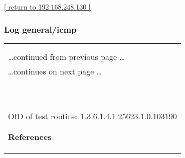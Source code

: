 \documentclass{article}
\begin{document}
\begin{footnotesize}\hyperref[host:192.168.248.130]{[ return to 192.168.248.130 ]}\end{footnotesize}
\subsubsection{Log general/icmp}
\label{port:192.168.248.130 general/icmp Log}

\begin{longtable}{|p{}|}
\hline
\rowcolor{openvas_log}{\color{white}{Log (CVSS: 0.0) }}\\
\rowcolor{openvas_log}{\color{white}{NVT: ICMP Timestamp Detection}}\\
\hline
\endfirsthead
\hfill\ldots continued from previous page \ldots \\
\hline
\endhead
\hline
\ldots continues on next page \ldots \\
\endfoot
\hline
\endlastfoot
\\
\rowcolor{white}{\verb= Summary:=}\\
\rowcolor{white}{\verb= The remote host responded to an ICMP timestamp request. The Timestamp Reply is=}\\
\rowcolor{white}{\verb=an ICMP message which replies to a Timestamp message. It consists of the=}\\
\rowcolor{white}{\verb=originating timestamp sent by the sender of the Timestamp as well as a receive=}\\
\rowcolor{white}{\verb=timestamp and a transmit timestamp. This information could theoretically be used=}\\
\rowcolor{white}{\verb=to exploit weak time-based random number generators in other services.=}\\
\rowcolor{white}{\verb==}\\
\rowcolor{white}{\verb==}\\
\\
OID of test routine: 1.3.6.1.4.1.25623.1.0.103190\\
\\

      \hline
      \\
\textbf{References}\\
\rowcolor{white}{\verb=CVE: CVE-1999-0524=}\\
\rowcolor{white}{\verb=Other:=}\\
\rowcolor{white}{\verb=  URL:http://www.ietf.org/rfc/rfc0792.txt=}\\
\end{longtable}
\end{document}
